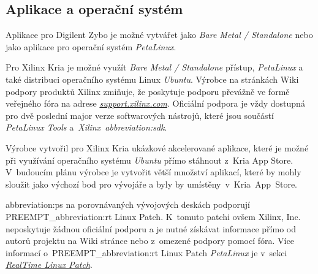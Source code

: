 \documentclass[a4paper, twoside, 11pt]{article}
\begin{document}
			\subsection{Aplikace a operační systém}\label{subsec:aplikace-a-operacni-system}
				Aplikace pro Digilent Zybo je možné vytvářet jako \textit{Bare Metal / Standalone} nebo jako aplikace pro operační systém \textit{PetaLinux}.\par
				Pro Xilinx Kria je možné využít \textit{Bare Metal / Standalone} přístup, \textit{PetaLinux} a také distribuci operačního systému Linux \textit{Ubuntu}. Výrobce na stránkách Wiki podpory produktů Xilinx zmiňuje, že poskytuje podporu převážně ve formě veřejného fóra na adrese \href{https://support.xilinx.com}{\textcolor{ctublue}{\textit{support.xilinx.com}}}. Oficiální podpora je vždy dostupná pro dvě poslední major verze softwarových nástrojů, které jsou součástí \textit{PetaLinux Tools} a~\textit{Xilinx~\gls{abbreviation:sdk}}. \cite{xilinx-wiki-atlassian-embedded-sw-support}\par
				Výrobce vytvořil pro Xilinx Kria ukázkové akcelerované aplikace, které je možné při využívání operačního systému \textit{Ubuntu} přímo stáhnout z~Kria App Store. V~budoucím plánu výrobce je vytvořit větší množství aplikací, které by mohly sloužit jako výchozí bod pro vývojáře a byly by umístěny~v~Kria~App~Store. \cite{xilinx-appstore-for-kria-soms}\par
				\gls{abbreviation:ps} na porovnávaných vývojových deskách podporují PREEMPT\_\gls{abbreviation:rt} Linux Patch. K~tomuto patchi ovšem Xilinx, Inc. neposkytuje žádnou oficiální podporu a je nutné získávat informace přímo od autorů projektu na Wiki stránce \cite{wiki-linux-foundation-real-time-linux} nebo z~omezené podpory pomocí fóra. Více informací o~PREEMPT\_\gls{abbreviation:rt} Linux Patch \textit{PetaLinux} je v~sekci \hyperref[subsec:real-time-linux-patch]{\textit{RealTime Linux Patch}}.
\end{document}
